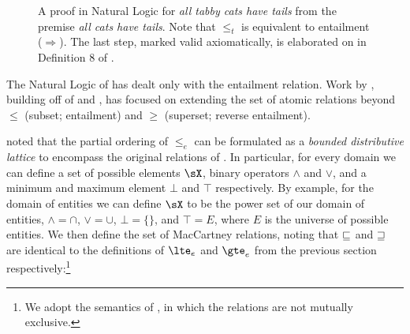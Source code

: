 \begin{figure*}
  \begin{prooftree}
  \end{prooftree}
\caption{\label{fig:catsproof}
  A proof in Natural Logic for \textit{all tabby cats have tails} from
    the premise \textit{all cats have tails}.
  Note that $\le_t$ is equivalent to entailment ($\Rightarrow$).
  The last step, marked valid axiomatically, is elaborated on in
    Definition 8 of .
} 
\end{figure*}


%
%
The Natural Logic of  has dealt only with the
  entailment relation.
Work by , building off of
   and
  ,
  has focused on extending the set of atomic relations
  beyond $\leq$ (subset; entailment) and 
  $\geq$ (superset; reverse entailment).

 noted that the partial ordering of
  $\leq_e$ can be formulated as a \textit{bounded distributive
  lattice} to encompass the original relations of
  .
In particular, for every domain we can define a set of possible 
  elements $\sX$, binary operators $\land$ and $\lor$,
  and a minimum and maximum element $\bot$ and $\top$ respectively.
By example, for the domain of entities we can define $\sX$ to be
  the power set of our domain of entities, $\land=\cap$,
  $\lor=\cup$, $\bot=\{\}$, and $\top=E$, where $E$ is the universe
  of possible entities.
We then define the set of MacCartney relations, noting that
  $\forward$ and $\reverse$ are identical to the definitions of
  $\lte_e$ and $\gte_e$ from the previous section respectively:\footnote{
    We adopt the semantics of , 
    in which the relations are not mutually exclusive.
  }

